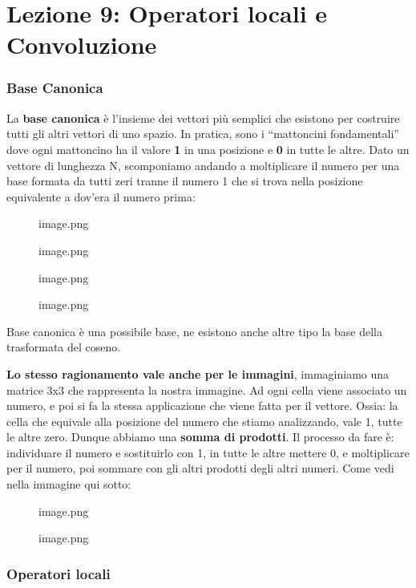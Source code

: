 \documentclass[
]{article}
\author{}
\date{}
\begin{document}
\hypertarget{lezione-9-operatori-locali-e-convoluzione}{%
\section{Lezione 9: Operatori locali e Convoluzione}\label{lezione-9-operatori-locali-e-convoluzione}}

\hypertarget{base-canonica}{%
\subsubsection{Base Canonica}\label{base-canonica}}

La \textbf{base canonica} è l'insieme dei vettori più semplici che esistono per costruire tutti gli altri vettori di uno spazio. In pratica, sono i ``mattoncini fondamentali'' dove ogni mattoncino ha il valore \textbf{1} in una posizione e \textbf{0} in tutte le altre.
Dato un vettore di lunghezza N, scomponiamo andando a moltiplicare il numero per una base formata da tutti zeri tranne il numero 1 che si trova nella posizione equivalente a dov'era il numero prima:

\begin{figure}
\centering
{image.png}
\caption{image.png}
\end{figure}

\begin{figure}
\centering
{image.png}
\caption{image.png}
\end{figure}

Base canonica è una possibile base, ne esistono anche altre tipo la base della trasformata del coseno.

\textbf{Lo stesso ragionamento vale anche per le immagini}, immaginiamo una matrice 3x3 che rappresenta la nostra immagine. Ad ogni cella viene associato un numero, e poi si fa la stessa applicazione che viene fatta per il vettore. Ossia: la cella che equivale alla posizione del numero che stiamo analizzando, vale 1, tutte le altre zero.
Dunque abbiamo una \textbf{somma di prodotti}.
Il processo da fare è:
individuare il numero e sostituirlo con 1, in tutte le altre mettere 0, e moltiplicare per il numero, poi sommare con gli altri prodotti degli altri numeri. Come vedi nella immagine qui sotto:

\begin{figure}
\centering
{image.png}
\caption{image.png}
\end{figure}

\hypertarget{operatori-locali}{%
\subsubsection{Operatori locali}\label{operatori-locali}}
\end{document}
